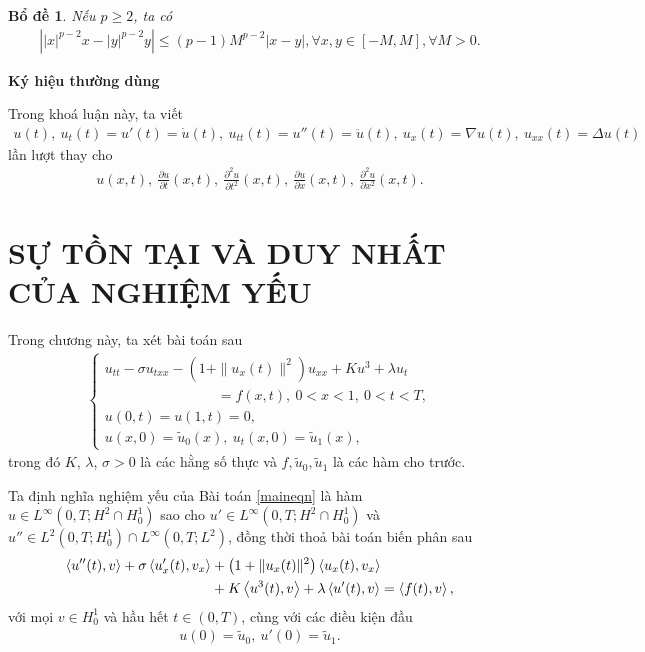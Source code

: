 \documentclass[12pt,a4paper]{article}
\newtheorem{lemma}[theorem]{Bổ đề}[section]
\theoremstyle{definition}
\theoremstyle{definition}
\begin{document}
\begin{lemma}
Nếu $p \ge 2$, ta có
\begin{align*}
    \left| |x|^{p-2} x - |y|^{p-2} y \right| \le (p - 1) M^{p-2} |x-y|, \forall x, y \in [-M, M], \forall M > 0.
\end{align*}
\end{lemma}

\textbf{Ký hiệu thường dùng}

Trong khoá luận này, ta viết
\begin{align*}
    u(t), \: u_t(t) = u'(t) = \dot{u}(t), \: u_{tt}(t) = u''(t) = \ddot{u}(t), \: u_x(t) = \nabla u(t), \: u_{xx}(t) = \Delta u(t)
\end{align*}
lần lượt thay cho 
\begin{align*}
    u(x,t), \: \frac{\partial u}{\partial t}(x,t), \: \frac{\partial^2 u}{\partial t^2}(x,t), \: \frac{\partial u}{\partial x}(x,t), \: \frac{\partial^2 u}{\partial x^2}(x,t).
\end{align*}
\pagebreak

\section[Sự tồn tại và duy nhất của nghiệm yếu]{SỰ TỒN TẠI VÀ DUY NHẤT CỦA NGHIỆM YẾU}

Trong chương này, ta xét bài toán sau
\begin{align}
    \begin{cases}
        u_{tt} - \sigma u_{txx} - \left(1 + \|u_x(t)\|^2\right) u_{xx} + Ku^3 + \lambda u_t \\
        \quad\quad\quad\quad\quad\quad\quad\quad = f(x,t),\: 0 < x < 1,\: 0 < t < T, \label{maineqn}\\
        u(0,t) = u(1,t) = 0, \\
        u(x,0) = \tilde{u}_0(x),\ u_t(x,0) = \tilde{u}_1(x),
    \end{cases}
\end{align}
trong đó $K$, $\lambda$, $\sigma > 0$ là các hằng số thực và $f, \tilde{u}_0, \tilde{u}_1$ là các hàm cho trước.

Ta định nghĩa nghiệm yếu của Bài toán \eqref{maineqn} là hàm $u \in L^\infty(0,T;H^2 \cap H^1_0)$ sao cho $u' \in L^\infty(0,T;H^2 \cap H^1_0)$ và $u'' \in L^2(0,T;H^1_0) \cap L^\infty(0,T;L^2)$, đồng thời thoả bài toán biến phân sau
\begin{align}
    \left< u''(t), v \right> + \sigma \left< u'_x(t), v_x \right> &+ \left(1 + \|u_x(t)\|^2\right) \left< u_x(t), v_x \right> \\
    &+ K \left< u^3(t), v \right> + \lambda \left< u'(t), v \right> = \left< f(t), v \right>, \notag
\end{align}
với mọi $v \in H^1_0$ và hầu hết $t \in (0,T)$, cùng với các điều kiện đầu
\begin{align}
    u(0) = \tilde{u}_0,\: u'(0) = \tilde{u}_1.
\end{align}
\end{document}

